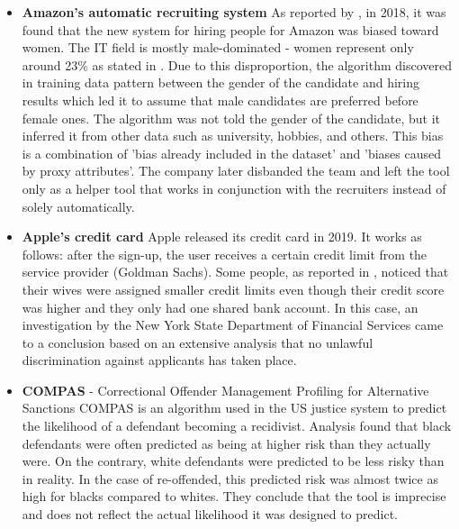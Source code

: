 \begin{itemize}
    \item \textbf{Amazon's automatic recruiting system}\newline
    As reported by \cite{amazon-unfair-hiring-2018}, in 2018, it was found that the new system for hiring people for Amazon was biased toward women. The IT field is mostly male-dominated - women represent only around 23\% as stated in \cite{women-in-tech-2021}. Due to this disproportion, the algorithm discovered in training data pattern between the gender of the candidate and hiring results which led it to assume that male candidates are preferred before female ones. The algorithm was not told the gender of the candidate, but it inferred it from other data such as university, hobbies, and others. This bias is a combination of 'bias already included in the dataset' and 'biases caused by proxy attributes'. The company later disbanded the team and left the tool only as a helper tool that works in conjunction with the recruiters instead of solely automatically.
    
    \item \textbf{Apple's credit card}\newline
    Apple released its credit card in 2019. It works as follows: after the sign-up, the user receives a certain credit limit from the service provider (Goldman Sachs). Some people, as reported in \cite{apple-card-washingtonpost-2019}, noticed that their wives were assigned smaller credit limits even though their credit score was higher and they only had one shared bank account.
    In this case, an investigation by the New York State Department of Financial Services came to a conclusion based on an extensive analysis that no unlawful discrimination against applicants has taken place.
    
    \item \textbf{COMPAS} - Correctional Offender Management Profiling for Alternative Sanctions\newline
    COMPAS is an algorithm used in the US justice system to predict the likelihood of a defendant becoming a recidivist. Analysis \cite{compas-analysis-2020} found that black defendants were often predicted as being at higher risk than they actually were. On the contrary, white defendants were predicted to be less risky than in reality. In the case of re-offended, this predicted risk was almost twice as high for blacks compared to whites. They conclude that the tool is imprecise and does not reflect the actual likelihood it was designed to predict.
\end{itemize}

